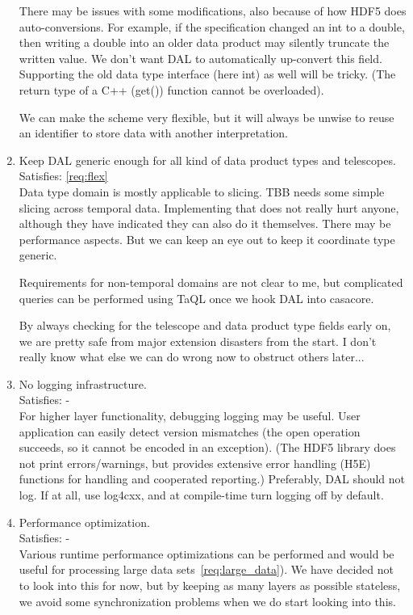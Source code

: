 \documentclass[a4paper,11pt]{article}
\begin{document}
\begin{enumerate}[label=\it D.\arabic{*}]
There may be issues with some modifications, also because of how HDF5 does auto-conversions.
For example, if the specification changed an int to a double, then writing a double into an older data product may silently truncate the written value.
We don't want DAL to automatically up-convert this field.
Supporting the old data type interface (here int) as well will be tricky.
(The return type of a C++ (get()) function cannot be overloaded).

We can make the scheme very flexible, but it will always be unwise to reuse an identifier to store data with another interpretation.

\item \label{dsg:flex} Keep DAL generic enough for all kind of data product types and telescopes.
Satisfies: \ref{req:flex}\\
Data type domain is mostly applicable to slicing.
TBB needs some simple slicing across temporal data.
Implementing that does not really hurt anyone, although they have indicated they can also do it themselves.
There may be performance aspects.
But we can keep an eye out to keep it coordinate type generic.

Requirements for non-temporal domains are not clear to me, but complicated queries can be performed using TaQL once we hook DAL into casacore.

By always checking for the telescope and data product type fields early on, we are pretty safe from major extension disasters from the start.
I don't really know what else we can do wrong now to obstruct others later...

\item \label{dsg:logging} No logging infrastructure.\\
Satisfies: -\\
For higher layer functionality, debugging logging may be useful.
User application can easily detect version mismatches (the open operation succeeds, so it cannot be encoded in an exception).
(The HDF5 library does not print errors/warnings, but provides extensive error handling (H5E) functions for handling and cooperated reporting.)
Preferably, DAL should not log.
If at all, use log4cxx, and at compile-time turn logging off by default.

\item \label{dsg:perf_opt} Performance optimization.\\
Satisfies: -\\

Various runtime performance optimizations can be performed and would be useful for processing large data sets~\ref{req:large_data}).
We have decided not to look into this for now, but by keeping as many layers as possible stateless, we avoid some synchronization problems when we do start looking into this.


\end{enumerate}
\end{document}
